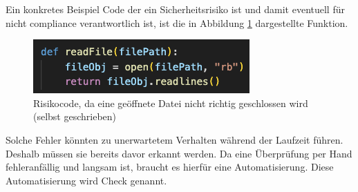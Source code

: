 \documentclass[../main.tex]{subfiles}
\begin{document}
Ein konkretes Beispiel Code der ein Sicherheitsrisiko ist und damit eventuell für nicht compliance verantwortlich ist, ist die in Abbildung \ref{fig:codecompliance} dargestellte Funktion.

\begin{figure}[ht]
    \centering
    \includegraphics[scale=1]{bilder/CodeScreenShot.png}
    \caption{Risikocode, da eine geöffnete Datei nicht richtig geschlossen wird (selbst geschrieben)}
    
    \label{fig:codecompliance}
\end{figure}

Solche Fehler könnten zu unerwartetem Verhalten während der Laufzeit führen.
Deshalb müssen sie bereits davor erkannt werden.
Da eine Überprüfung per Hand fehleranfällig und langsam ist, braucht es hierfür eine Automatisierung.
Diese Automatisierung wird Check genannt.
\end{document}
